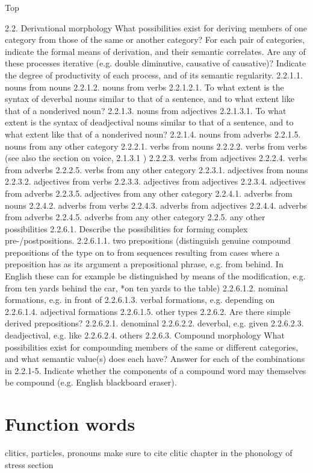 Top

2.2. Derivational morphology
What possibilities exist for deriving members of one category from those of the same or another category? For each pair of categories, indicate the formal means of derivation, and their semantic correlates. Are any of these processes iterative (e.g. double diminutive, causative of causative)? Indicate the degree of productivity of each process, and of its semantic regularity.
2.2.1.1. nouns from nouns
2.2.1.2. nouns from verbs
2.2.1.2.1. To what extent is the syntax of deverbal nouns similar to that of a sentence, and to what extent like that of a nonderived noun?
2.2.1.3. nouns from adjectives
2.2.1.3.1. To what extent is the syntax of deadjectival nouns similar to that of a sentence, and to what extent like that of a nonderived noun?
2.2.1.4. nouns from adverbs
2.2.1.5. nouns from any other category
2.2.2.1. verbs from nouns
2.2.2.2. verbs from verbs (see also the section on voice, 2.1.3.1 )
2.2.2.3. verbs from adjectives
2.2.2.4. verbs from adverbs
2.2.2.5. verbs from any other category
2.2.3.1. adjectives from nouns
2.2.3.2. adjectives from verbs
2.2.3.3. adjectives from adjectives
2.2.3.4. adjectives from adverbs
2.2.3.5. adjectives from any other category
2.2.4.1. adverbs from nouns
2.2.4.2. adverbs from verbs
2.2.4.3. adverbs from adjectives
2.2.4.4. adverbs from adverbs
2.2.4.5. adverbs from any other category
2.2.5. any other possibilities
2.2.6.1. Describe the possibilities for forming complex pre-/postpositions.
2.2.6.1.1. two prepositions (distinguish genuine compound prepositions of the type on to from sequences resulting from cases where a preposition has as its argument a prepositional phrase, e.g. from behind. In English these can for example be distinguished by means of the modification, e.g. from ten yards behind the car, *on ten yards to the table)
2.2.6.1.2. nominal formations, e.g. in front of
2.2.6.1.3. verbal formations, e.g. depending on
2.2.6.1.4. adjectival formations
2.2.6.1.5. other types
2.2.6.2. Are there simple derived prepositions?
2.2.6.2.1. denominal
2.2.6.2.2. deverbal, e.g. given
2.2.6.2.3. deadjectival, e.g. like
2.2.6.2.4. others
2.2.6.3. Compound morphology
What possibilities exist for compounding members of the same or different categories, and what semantic value(s) does each have? Answer for each of the combinations in 2.2.1-5. Indicate whether the components of a compound word may themselves be compound (e.g. English blackboard eraser).
\part{Function words}
clitics, particles, pronouns
make sure to cite clitic chapter in the phonology of stress section



